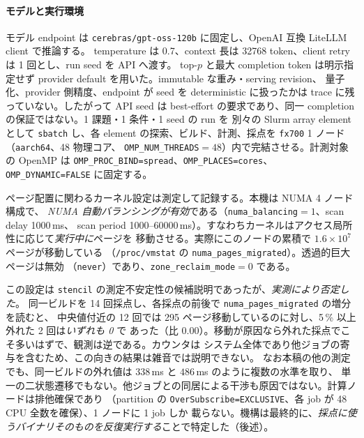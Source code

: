 \documentclass[conference,letterpaper]{IEEEtran}
\begin{document}
\paragraph{モデルと実行環境}
モデル endpoint は \texttt{cerebras/gpt-oss-120b} に固定し、OpenAI 互換 LiteLLM client で推論する。
temperature は 0.7、context 長は 32768 token、client retry は 1 回とし、run seed を API へ渡す。
top-$p$ と最大 completion token は明示指定せず provider default を用いた。immutable な重み・serving revision、
量子化、provider 側精度、endpoint が seed を deterministic に扱ったかは trace に残っていない。したがって API
seed は best-effort の要求であり、同一 completion の保証ではない。1 課題・1 条件・1 seed の run を
別々の Slurm array element として \texttt{sbatch} し、各 element の探索、ビルド、計測、採点を
\texttt{fx700} 1 ノード（\texttt{aarch64}、48 物理コア、
\texttt{OMP\_NUM\_THREADS}$=48$）内で完結させる。計測対象の OpenMP は
\texttt{OMP\_PROC\_BIND=spread}、\texttt{OMP\_PLACES=cores}、
\texttt{OMP\_DYNAMIC=FALSE} に固定する。

ページ配置に関わるカーネル設定は測定して記録する。本機は NUMA 4 ノード構成で、
\emph{NUMA 自動バランシングが有効}である（\texttt{numa\_balancing}$=1$、scan delay 1000\,ms、
scan period 1000--60000\,ms）。すなわちカーネルはアクセス局所性に応じて\emph{実行中に}ページを
移動させる。実際にこのノードの累積で $1.6\times10^{7}$ ページが移動している
（\texttt{/proc/vmstat} の \texttt{numa\_pages\_migrated}）。透過的巨大ページは無効
（\texttt{never}）であり、\texttt{zone\_reclaim\_mode}$=0$ である。

この設定は \texttt{stencil} の測定不安定性の候補説明であったが、\emph{実測により否定した}。
同一ビルドを 14 回採点し、各採点の前後で \texttt{numa\_pages\_migrated} の増分を読むと、
中央値付近の 12 回では 295 ページ移動しているのに対し、5\,\% 以上外れた 2 回は\emph{いずれも 0} で
あった（比 $0.00$）。移動が原因なら外れた採点でこそ多いはずで、観測は逆である。カウンタは
システム全体であり他ジョブの寄与を含むため、この向きの結果は雑音では説明できない。
なお本稿の他の測定でも、同一ビルドの外れ値は $338$\,ms と $486$\,ms のように複数の水準を取り、
単一の二状態遷移でもない。他ジョブとの同居による干渉も原因ではない。計算ノードは排他確保であり
（partition の \texttt{OverSubscribe=EXCLUSIVE}、各 job が 48 CPU 全数を確保）、1 ノードに 1 job しか
載らない。機構は最終的に、\emph{採点に使うバイナリそのものを反復実行する}ことで特定した（後述）。
\end{document}
